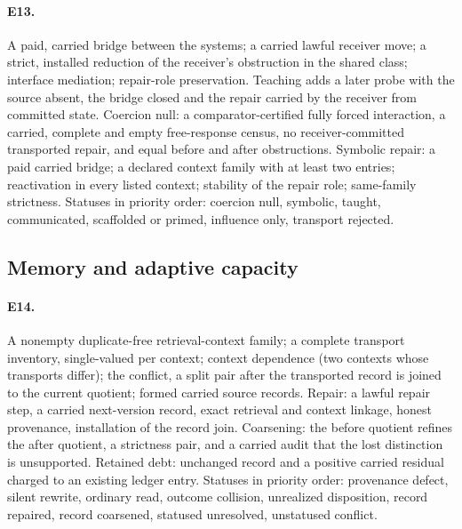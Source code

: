 \paragraph{E13.} A paid, carried bridge between the systems; a carried lawful receiver move; a strict,
installed reduction of the receiver's obstruction in the shared class; interface mediation; repair-role
preservation. Teaching adds a later probe with the source absent, the bridge closed and the repair
carried by the receiver from committed state. Coercion null: a comparator-certified fully forced
interaction, a carried, complete and empty free-response census, no receiver-committed transported repair, and
equal before and after obstructions. Symbolic repair: a paid carried bridge; a declared context family
with at least two entries; reactivation in every listed context; stability of the repair role;
same-family strictness. Statuses in priority order: coercion null, symbolic, taught, communicated,
scaffolded or primed, influence only, transport rejected.

\subsection{Memory and adaptive capacity}

\paragraph{E14.} A nonempty duplicate-free retrieval-context family; a complete transport inventory,
single-valued per context; context dependence (two contexts whose transports differ); the conflict, a
split pair after the transported record is joined to the current quotient; formed carried source
records. Repair: a lawful repair step, a carried next-version record, exact retrieval and context
linkage, honest provenance, installation of the record join. Coarsening: the before quotient refines the
after quotient, a strictness pair, and a carried audit that the lost
distinction is unsupported. Retained debt: unchanged record and a positive carried residual charged to
an existing ledger entry. Statuses in priority order: provenance defect, silent rewrite, ordinary read,
outcome collision, unrealized disposition, record repaired, record coarsened, statused unresolved,
unstatused conflict.

